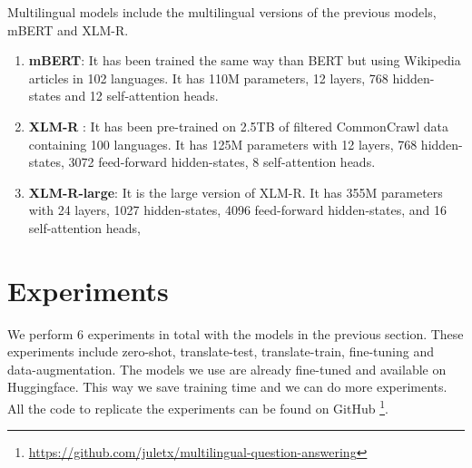 \documentclass[11pt]{article}
\begin{document}
Multilingual models include the multilingual versions of the previous models, mBERT and XLM-R.

\begin{enumerate}
    \item \textbf{mBERT}: It has been trained the same way than BERT but using Wikipedia articles in 102 languages. It has 110M parameters, 12 layers, 768 hidden-states and 12 self-attention heads.
    \item \textbf{XLM-R} \cite{XLM-R}: It has been pre-trained on 2.5TB of filtered CommonCrawl data containing 100 languages. It has 125M parameters with 12 layers, 768 hidden-states, 3072 feed-forward hidden-states, 8 self-attention heads.
    \item \textbf{XLM-R-large}: It is the large version of XLM-R. It has 355M parameters with 24 layers, 1027 hidden-states, 4096 feed-forward hidden-states, and 16 self-attention heads,
\end{enumerate}

\section{Experiments}

We perform 6 experiments in total with the models in the previous section. These experiments include zero-shot, translate-test, translate-train, fine-tuning and data-augmentation. The models we use are already fine-tuned and available on Huggingface. This way we save training time and we can do more experiments. All the code to replicate the experiments can be found on GitHub \footnote{\url{https://github.com/juletx/multilingual-question-answering}}.
\end{document}
